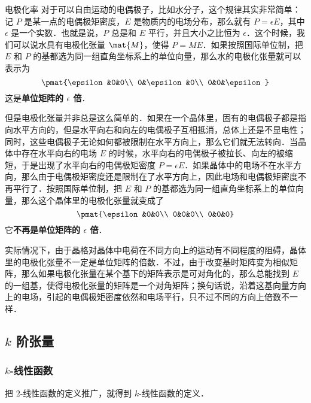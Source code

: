 \begin{example}{电极化率}
对于可以自由运动的电偶极子，比如水分子，这个规律其实非常简单：记 ${P}$ 是某一点的电偶极矩密度，${E}$ 是物质内的电场分布，那么就有 ${P}=\epsilon{E}$，其中 $\epsilon$ 是一个实数．也就是说，${P}$ 总是和 ${E}$ 平行，并且大小之比恒为 $\epsilon$．这个时候，我们可以说水具有电极化张量 $\mat{M}$，使得 ${P}={M}{E}$．如果按照国际单位制，把 ${E}$ 和 ${P}$ 的基都选为同一组直角坐标系上的单位向量，那么水的电极化张量就可以表示为
\begin{equation}
\pmat{\epsilon&0&0\\ 0&\epsilon&0\\ 0&0&\epsilon}
\end{equation}
这是\textbf{单位矩阵的 $\epsilon$ 倍}．

但是电极化张量并非总是这么简单的．如果在一个晶体里，固有的电偶极子都是指向水平方向的，但是水平向右和向左的电偶极子互相抵消，总体上还是不显电性；同时，这些电偶极子无论如何都被限制在水平方向上，那么它们就无法转向．当晶体中存在水平向右的电场 ${E}$ 的时候，水平向右的电偶极子被拉长、向左的被缩短，于是出现了水平向右的电偶极矩密度 ${P}=\epsilon{E}$．如果晶体中的电场不在水平方向，那么由于电偶极矩密度还是限制在了水平方向上，因此电场和电偶极矩密度不再平行了．按照国际单位制，把 ${E}$ 和 ${P}$ 的基都选为同一组直角坐标系上的单位向量，那么这个晶体里的电极化张量就变成了
\begin{equation}
\pmat{\epsilon&0&0\\ 0&0&0\\ 0&0&0}
\end{equation}
它\textbf{不再是单位矩阵的 $\epsilon$ 倍}．

实际情况下，由于晶格对晶体中电荷在不同方向上的运动有不同程度的阻碍，晶体里的电极化张量不一定是单位矩阵的倍数．不过，由于改变基时矩阵变为相似矩阵，那么如果电极化张量在某个基下的矩阵表示是可对角化的，那么总能找到 ${E}$ 的一组基，使得电极化张量的矩阵是一个对角矩阵；换句话说，沿着这基向量方向上的电场，引起的电偶极矩密度依然和电场平行，只不过不同的方向上倍数不一样．

\end{example}


\subsection{$k$ 阶张量}

\subsubsection{$k$-线性函数}

把 $2$-线性函数的定义推广，就得到 $k$-线性函数的定义．

